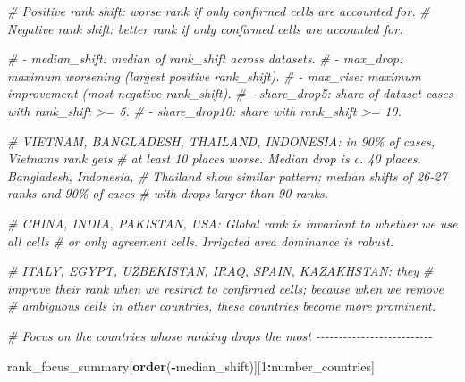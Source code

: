 \documentclass[
  11pt,
]{article}
\newenvironment{Shaded}{\begin{snugshade}}{\end{snugshade}}
\newcommand{\CommentTok}[1]{\textcolor[rgb]{0.56,0.35,0.01}{\textit{#1}}}
\newcommand{\DecValTok}[1]{\textcolor[rgb]{0.00,0.00,0.81}{#1}}
\newcommand{\FunctionTok}[1]{\textcolor[rgb]{0.13,0.29,0.53}{\textbf{#1}}}
\newcommand{\NormalTok}[1]{#1}
\newcommand{\SpecialCharTok}[1]{\textcolor[rgb]{0.81,0.36,0.00}{\textbf{#1}}}
\begin{document}
\begin{Shaded}
\begin{Highlighting}[]
\CommentTok{\# Positive rank shift: worse rank if only confirmed cells are accounted for.}
\CommentTok{\# Negative rank shift: better rank if only confirmed cells are accounted for.}

\CommentTok{\# {-} median\_shift: median of rank\_shift across datasets.}
\CommentTok{\# {-} max\_drop: maximum worsening (largest positive rank\_shift).}
\CommentTok{\# {-} max\_rise: maximum improvement (most negative rank\_shift).}
\CommentTok{\# {-} share\_drop5: share of dataset cases with rank\_shift \textgreater{}= 5.}
\CommentTok{\# {-} share\_drop10: share with rank\_shift \textgreater{}= 10.}

\CommentTok{\# VIETNAM, BANGLADESH, THAILAND, INDONESIA: in 90\% of cases, Vietnam\textquotesingle{}s rank gets }
\CommentTok{\# at least 10 places worse. Median drop is c. 40 places. Bangladesh, Indonesia, }
\CommentTok{\# Thailand show similar pattern; median shifts of 26{-}27 ranks and 90\% of cases }
\CommentTok{\# with drops larger than 90 ranks.}

\CommentTok{\# CHINA, INDIA, PAKISTAN, USA: Global rank is invariant to whether we use all cells}
\CommentTok{\# or only agreement cells. Irrigated area dominance is robust.}

\CommentTok{\# ITALY, EGYPT, UZBEKISTAN, IRAQ, SPAIN, KAZAKHSTAN: they}
\CommentTok{\# improve their rank when we restrict to confirmed cells; because when we remove}
\CommentTok{\# ambiguous cells in other countries, these countries become more prominent.}

\CommentTok{\# Focus on the countries whose ranking drops the most {-}{-}{-}{-}{-}{-}{-}{-}{-}{-}{-}{-}{-}{-}{-}{-}{-}{-}{-}{-}{-}{-}{-}{-}{-}{-}}

\NormalTok{rank\_focus\_summary[}\FunctionTok{order}\NormalTok{(}\SpecialCharTok{{-}}\NormalTok{median\_shift)][}\DecValTok{1}\SpecialCharTok{:}\NormalTok{number\_countries]}
\end{Highlighting}
\end{Shaded}
\end{document}
